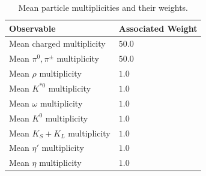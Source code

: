 \documentclass[aps,preprint,floatfix,nofootinbib,showpacs]{revtex4-1}
\begin{document}
 \begin{table}[tbp]
  \begin{center}
   \begin{tabular}{l|l}
    \hline 
    \hline
    Observable  \hspace{3cm} &  \hspace{1cm} Associated Weight \\ \hline
    Mean charged multiplicity & \hspace{3cm} $50.0$ \\ \hline
    Mean $\pi^0, \pi^\pm$ multiplicity & \hspace{3cm} $50.0$ \\ \hline
    Mean $\rho$ multiplicity &\hspace{3cm} $1.0$ \\ \hline
    Mean $K^{*0}$ multiplicity &\hspace{3cm} $1.0$ \\ \hline
    Mean $\omega$ multiplicity & \hspace{3cm} $1.0$ \\ \hline
    Mean $K^0$ multiplicity & \hspace{3cm} $1.0$ \\ \hline
    Mean $K_S + K_L$ multiplicity & \hspace{3cm} $1.0$ \\ \hline
    Mean $\eta'$ multiplicity & \hspace{3cm} $1.0$ \\ \hline
    Mean $\eta$ multiplicity & \hspace{3cm} $1.0$ \\ \hline \hline
   \end{tabular}
  \end{center}
  \caption{Mean particle multiplicities and their weights.}
  \label{Tab2}
 \end{table}
\end{document}
